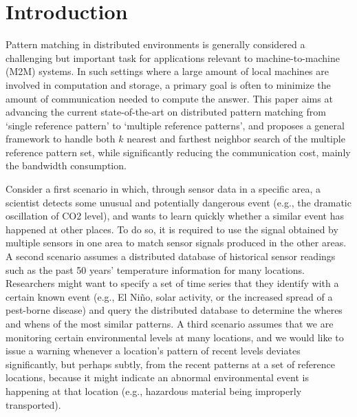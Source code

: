 \section{Introduction}\label{sec:intro}

Pattern matching in distributed environments is
generally considered a challenging but important task for applications
relevant to machine-to-machine (M2M) systems. In such
settings where a large amount of local machines are involved in computation and storage, a primary goal is often to minimize the amount of communication
needed to compute the answer.  This paper aims at advancing the
current state-of-the-art on distributed pattern matching from
`single reference pattern' to `multiple reference patterns', and proposes a general framework
to handle both $k$ nearest and farthest neighbor search of the multiple reference pattern set, while
significantly reducing the communication cost, mainly the bandwidth consumption.

Consider a first scenario in which, through sensor data in a specific
area, a scientist detects some unusual and potentially dangerous event
(e.g., the dramatic oscillation of CO2 level), and wants to learn
quickly whether a similar event has happened at other places. To do
so, it is required to use the signal obtained by multiple sensors in
one area to match sensor signals produced in the other areas.  A
second scenario assumes a distributed database of historical sensor
readings such as the past 50 years' temperature information for many
locations.  Researchers might want to specify a set of time series
that they identify with a certain known event (e.g., El Ni\~{n}o,
solar activity, or the increased spread of a pest-borne disease) and
query the distributed database to determine the wheres and whens of
the most similar patterns.  A third scenario assumes that we are
monitoring certain environmental levels at many locations, and we
would like to issue a warning whenever a location's pattern of recent
levels deviates significantly, but perhaps subtly, from the recent
patterns at a set of reference locations, because it might indicate an
abnormal environmental event is happening at that location (e.g.,
hazardous material being improperly transported).

